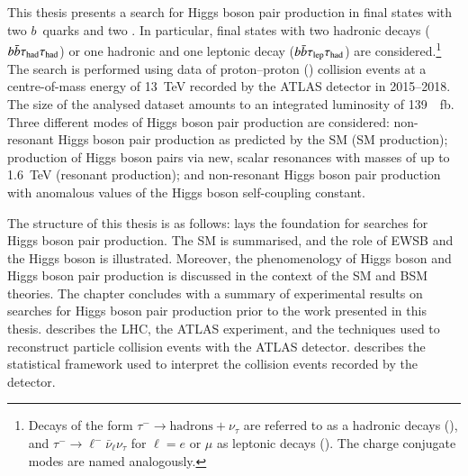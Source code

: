 This thesis presents a search for Higgs boson pair production in final states
with two $b$~quarks and two \tauleptons. In particular, final states with two
hadronic \tauleptonC decays ($b\bar{b}\tau_{\text{had}}\tau_{\text{had}}$) or one hadronic and one leptonic
\tauleptonC decay ($b\bar{b}\tau_{\text{lep}}\tau_{\text{had}}$) are considered.\footnote{Decays of the form
  $\tau^- \to \text{hadrons} + \nu_\tau$ are referred to as a hadronic
  \tauleptonC decays (\tauhad), and $\tau^- \to \ell^- \bar{\nu}_\ell \nu_\tau$
  for $\ell = e$ or $\mu$ as leptonic \tauleptonC decays (\taulep). The charge
  conjugate modes are named analogously.} The search is performed using data of
proton--proton (\pp) collision events at a centre-of-mass energy of
\SI{13}{\TeV} recorded by the ATLAS detector in 2015--2018. The size of the
analysed dataset amounts to an integrated luminosity of
\SI{139}{\per\femto\barn}. Three different modes of Higgs boson pair production
are considered: non-resonant Higgs boson pair production as predicted by the SM
(SM \HH production); production of Higgs boson pairs via new, scalar resonances
with masses of up to \SI{1.6}{\TeV} (resonant \HH production); and non-resonant
Higgs boson pair production with anomalous values of the Higgs boson
self-coupling constant.

The structure of this thesis is as follows:  lays the
foundation for searches for Higgs boson pair production. The SM is summarised,
and the role of EWSB and the Higgs boson is illustrated. Moreover, the
phenomenology of Higgs boson and Higgs boson pair production is discussed in the
context of the SM and BSM theories. The chapter concludes with a summary of
experimental results on searches for Higgs boson pair production prior to the
work presented in this thesis.   describes the LHC, the
ATLAS experiment, and the techniques used to reconstruct particle collision
events with the ATLAS detector.  describes the
statistical framework used to interpret the collision events recorded by the
detector.

